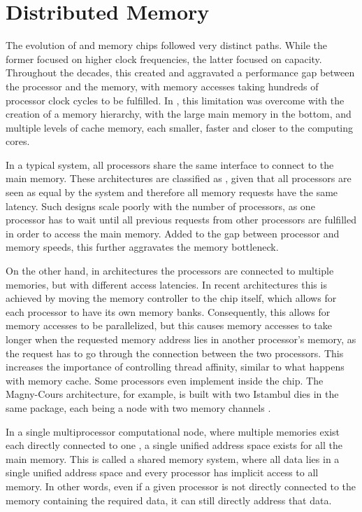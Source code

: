 \documentclass[../thesis]{subfiles}
\begin{document}
	\section{Distributed Memory}
	\label{sec:techbg:distmem}

	The evolution of \cpu and memory chips followed very distinct paths. While the former focused on higher clock frequencies, the latter focused on capacity. Throughout the decades, this created and aggravated a performance gap between the processor and the memory, with memory accesses taking hundreds of processor clock cycles to be fulfilled. In \cpus, this limitation was overcome with the creation of a memory hierarchy, with the large main memory in the bottom, and multiple levels of cache memory, each smaller, faster and closer to the computing cores.

	In a typical \smp system, all processors share the same interface to connect to the main memory. These architectures are classified as \uma, given that all processors are seen as equal by the system and therefore all memory requests have the same latency. Such designs scale poorly with the number of processors, as one processor has to wait until all previous requests from other processors are fulfilled in order to access the main memory. Added to the gap between processor and memory speeds, this further aggravates the memory bottleneck.

	On the other hand, in \numa architectures the processors are connected to multiple memories, but with different access latencies. In recent architectures this is achieved by moving the memory controller to the \cpu chip itself, which allows for each processor to have its own memory banks. Consequently, this allows for memory accesses to be parallelized, but this causes memory accesses to take longer when the requested memory address lies in another processor's memory, as the request has to go through the connection between the two processors. This increases the importance of controlling thread affinity, similar to what happens with memory cache. Some processors even implement \numa inside the chip. The \amd Magny-Cours architecture, for example, is built with two Istambul dies in the same package, each being a \numa node with two memory channels \cite{AMD:MagnyCours}.

	In a single multiprocessor computational node, where multiple memories exist each directly connected to one \cpu, a single unified address space exists for all the main memory. This is called a shared memory system, where all data lies in a single unified address space and every processor has implicit access to all memory. In other words, even if a given processor is not directly connected to the memory containing the required data, it can still directly address that data.
\end{document}
